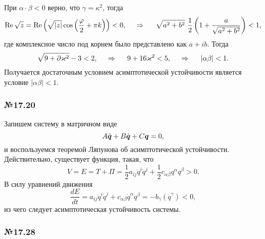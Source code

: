 При $\alpha \cdot \beta < 0$ верно, что $\gamma = \kappa^2$, тогда
\begin{equation*}
    \Re \sqrt{z} = \Re \left(
        \sqrt{|z|} \cos \left(
            \frac{\varphi}{2} + \pi k
        \right)
    \right) < 0,
    \hspace{0.5cm} \Rightarrow \hspace{0.5cm}
    \sqrt{a^2 + b^2} \ \frac{1}{2} \left(
        1 + \frac{a}{\sqrt{a^2 + b^2}}
    \right) < 1,
\end{equation*}
где комплексное число под корнем было представлено как $a + ib$. Тогда
\begin{equation*}
    \sqrt{9 + \partial \kappa^2} - 3 < 2,
    \hspace{0.5cm} \Rightarrow \hspace{0.5cm}
    9 + 16 \kappa^2 < 5, 
    \hspace{0.5cm} \Rightarrow \hspace{0.5cm}
    |\alpha \beta|  < 1.
\end{equation*}
Получается достаточным условием асимптотической устойчивости является условие $|\alpha \beta| < 1$.




\subsubsection*{№17.20}

Запишем систему в матричном виде
\begin{equation*}
    A \ddot{\vc{q}} + B \dot{\vc{q}} + C \vc{q} = 0,
\end{equation*}
и воспользуемся теоремой Ляпунова об асимптотической устойчивости. Действительно, существует функция, такая, что
\begin{equation*}
    V = E = T + \Pi = \frac{1}{2} a_{ij} \dot{q}^i \dot{q}^j + \frac{1}{2} c_{\alpha \beta} q^{\alpha} q^{\beta} > 0.
\end{equation*}
В силу уравнений движения
\begin{equation*}
    \frac{d E}{d t} = a_{ij} \ddot{q}^i \dot{q}^j + c_{\alpha \beta} \dot{q}^\alpha q^\beta = - b_\gamma (\dot{q}^\gamma) < 0,
\end{equation*}
из чего следует асимптотическая устойчивость системы.


\subsubsection*{№17.28}

